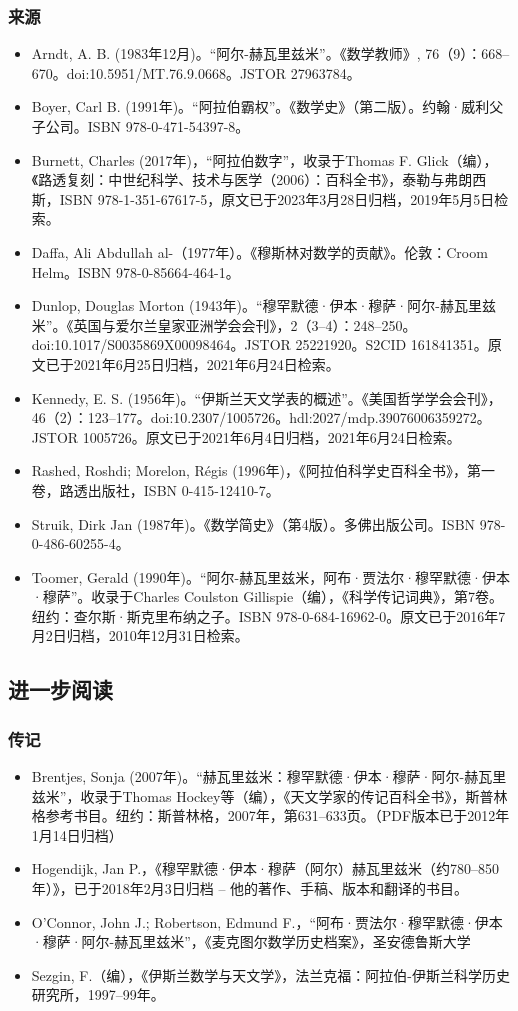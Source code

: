\subsubsection{来源}  
\begin{itemize}
\item Arndt, A. B. (1983年12月)。“阿尔-赫瓦里兹米”。《数学教师》, 76（9）：668–670。doi:10.5951/MT.76.9.0668。JSTOR 27963784。  
\item Boyer, Carl B. (1991年)。“阿拉伯霸权”。《数学史》（第二版）。约翰·威利父子公司。ISBN 978-0-471-54397-8。  
\item Burnett, Charles (2017年)，“阿拉伯数字”，收录于Thomas F. Glick（编），《路透复刻：中世纪科学、技术与医学（2006）：百科全书》，泰勒与弗朗西斯，ISBN 978-1-351-67617-5，原文已于2023年3月28日归档，2019年5月5日检索。  
\item Daffa, Ali Abdullah al-（1977年）。《穆斯林对数学的贡献》。伦敦：Croom Helm。ISBN 978-0-85664-464-1。  
\item Dunlop, Douglas Morton (1943年)。“穆罕默德·伊本·穆萨·阿尔-赫瓦里兹米”。《英国与爱尔兰皇家亚洲学会会刊》，2（3–4）：248–250。doi:10.1017/S0035869X00098464。JSTOR 25221920。S2CID 161841351。原文已于2021年6月25日归档，2021年6月24日检索。  
\item Kennedy, E. S. (1956年)。“伊斯兰天文学表的概述”。《美国哲学学会会刊》，46（2）：123–177。doi:10.2307/1005726。hdl:2027/mdp.39076006359272。JSTOR 1005726。原文已于2021年6月4日归档，2021年6月24日检索。  
\item Rashed, Roshdi; Morelon, Régis (1996年)，《阿拉伯科学史百科全书》，第一卷，路透出版社，ISBN 0-415-12410-7。  
\item Struik, Dirk Jan (1987年)。《数学简史》（第4版）。多佛出版公司。ISBN 978-0-486-60255-4。  
\item Toomer, Gerald (1990年)。“阿尔-赫瓦里兹米，阿布·贾法尔·穆罕默德·伊本·穆萨”。收录于Charles Coulston Gillispie（编），《科学传记词典》，第7卷。纽约：查尔斯·斯克里布纳之子。ISBN 978-0-684-16962-0。原文已于2016年7月2日归档，2010年12月31日检索。
\end{itemize}
\subsection{进一步阅读}  
\subsubsection{传记}  
\begin{itemize}
\item Brentjes, Sonja (2007年)。“赫瓦里兹米：穆罕默德·伊本·穆萨·阿尔-赫瓦里兹米”，收录于Thomas Hockey等（编），《天文学家的传记百科全书》，斯普林格参考书目。纽约：斯普林格，2007年，第631–633页。（PDF版本已于2012年1月14日归档）  
\item Hogendijk, Jan P.，《穆罕默德·伊本·穆萨（阿尔）赫瓦里兹米（约780–850年）》，已于2018年2月3日归档 – 他的著作、手稿、版本和翻译的书目。  
\item O'Connor, John J.; Robertson, Edmund F.，“阿布·贾法尔·穆罕默德·伊本·穆萨·阿尔-赫瓦里兹米”，《麦克图尔数学历史档案》，圣安德鲁斯大学  
\item Sezgin, F.（编），《伊斯兰数学与天文学》，法兰克福：阿拉伯-伊斯兰科学历史研究所，1997–99年。
\end{itemize}
